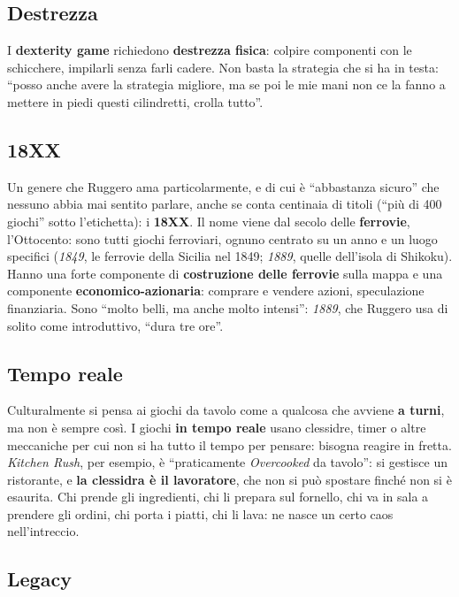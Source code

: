 \subsection{Destrezza}

I \textbf{dexterity game} richiedono \textbf{destrezza fisica}: colpire
componenti con le schicchere, impilarli senza farli cadere. Non basta la
strategia che si ha in testa: ``posso anche avere la strategia migliore, ma se poi
le mie mani non ce la fanno a mettere in piedi questi cilindretti, crolla
tutto''.

\subsection{18XX}

Un genere che Ruggero ama particolarmente, e di cui è ``abbastanza sicuro''
che nessuno abbia mai sentito parlare, anche se conta centinaia di titoli (``più
di 400 giochi'' sotto l'etichetta): i \textbf{18XX}. Il nome viene dal secolo
delle \textbf{ferrovie}, l'Ottocento: sono tutti giochi ferroviari, ognuno
centrato su un anno e un luogo specifici (\emph{1849}, le ferrovie della
Sicilia nel 1849; \emph{1889}, quelle dell'isola di Shikoku). Hanno una forte
componente di \textbf{costruzione delle ferrovie} sulla mappa e una componente
\textbf{economico-azionaria}: comprare e vendere azioni, speculazione
finanziaria. Sono ``molto belli, ma anche molto intensi'': \emph{1889}, che
Ruggero usa di solito come introduttivo, ``dura tre ore''.

\subsection{Tempo reale}

Culturalmente si pensa ai giochi da tavolo come a qualcosa che avviene
\textbf{a turni}, ma non è sempre così. I giochi \textbf{in tempo reale} usano
clessidre, timer o altre meccaniche per cui non si ha tutto il tempo per pensare:
bisogna reagire in fretta. \emph{Kitchen Rush}, per esempio, è ``praticamente
\emph{Overcooked} da tavolo'': si gestisce un ristorante, e \textbf{la clessidra
è il lavoratore}, che non si può spostare finché non si è esaurita. Chi prende
gli ingredienti, chi li prepara sul fornello, chi va in sala a prendere gli
ordini, chi porta i piatti, chi li lava: ne nasce un certo caos nell'intreccio.

\subsection{Legacy}

